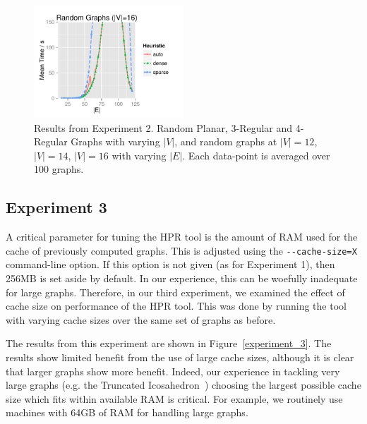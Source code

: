 \begin{figure}[!p]
\includegraphics[width=0.5\textwidth]{data/Exp2_random16_graphs.pdf}
\caption{Results from Experiment 2.  Random Planar, 3-Regular and 4-Regular Graphs with varying $|V|$, and random graphs at $|V|= 12$, $|V|= 14$, $|V|= 16$ with varying $|E|$.  Each data-point is averaged over 100 graphs.}
\label{experiment_2}
\end{figure}



\subsection{Experiment 3}
 
A critical parameter for tuning the HPR tool is the amount of RAM used for the cache of previously computed graphs.  This is adjusted using the \verb+--cache-size=X+ command-line option.  If this option is not given (as for Experiment 1), then 256MB is set aside by default.  In our experience, this can be woefully inadequate for large graphs.  Therefore, in our third experiment, we examined the effect of cache size on performance of the HPR tool.  This was done by running the tool with varying cache sizes over the same set of graphs as before.

The results from this experiment are shown in Figure~\ref{experiment_3}.  The results show limited benefit from the use of large cache sizes, although it is clear that larger graphs show more benefit.  Indeed, our experience in tackling very large graphs (e.g. the Truncated Icosahedron~\cite{HPR10}) choosing the largest possible cache size which fits within available RAM is critical.  For example, we routinely use machines with 64GB of RAM for handling large graphs.

